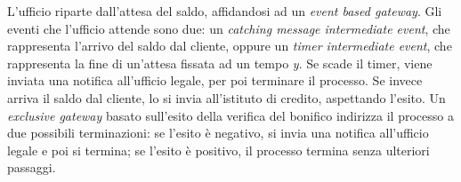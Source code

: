 L'ufficio riparte dall'attesa del saldo, affidandosi ad un
\textit{event based gateway}. Gli eventi che l'ufficio attende sono due:
un \textit{catching message intermediate event}, che rappresenta
l'arrivo del saldo dal cliente, oppure un
\textit{timer intermediate event}, che rappresenta la fine di un'attesa
fissata ad un tempo \textit{y}. Se scade il timer, viene inviata una
notifica all'ufficio legale, per poi terminare il processo.
Se invece arriva il saldo dal cliente, lo si invia all'istituto di
credito, aspettando l'esito. Un \textit{exclusive gateway} basato
sull'esito della verifica del bonifico indirizza il processo a due
possibili terminazioni: se l'esito \`e negativo, si invia una notifica
all'ufficio legale e poi si termina; se l'esito \`e positivo, il
processo termina senza ulteriori passaggi.
